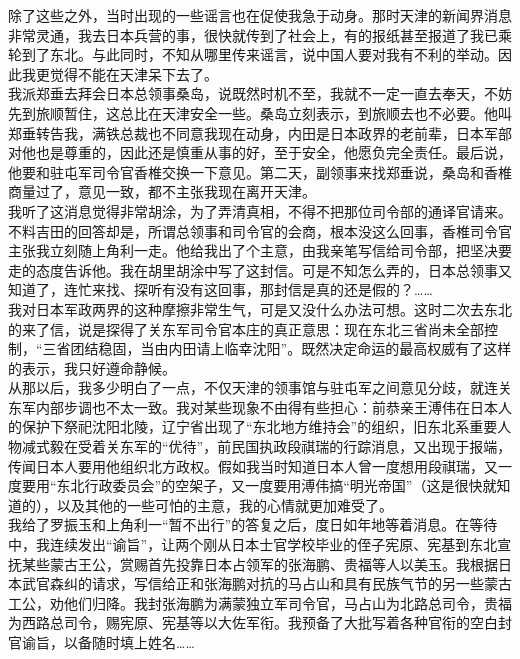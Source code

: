 除了这些之外，当时出现的一些谣言也在促使我急于动身。那时天津的新闻界消息非常灵通，我去日本兵营的事，很快就传到了社会上，有的报纸甚至报道了我已乘轮到了东北。与此同时，不知从哪里传来谣言，说中国人要对我有不利的举动。因此我更觉得不能在天津呆下去了。\\

我派郑垂去拜会日本总领事桑岛，说既然时机不至，我就不一定一直去奉天，不妨先到旅顺暂住，这总比在天津安全一些。桑岛立刻表示，到旅顺去也不必要。他叫郑垂转告我，满铁总裁也不同意我现在动身，内田是日本政界的老前辈，日本军部对他也是尊重的，因此还是慎重从事的好，至于安全，他愿负完全责任。最后说，他要和驻屯军司令官香椎交换一下意见。第二天，副领事来找郑垂说，桑岛和香椎商量过了，意见一致，都不主张我现在离开天津。\\

我听了这消息觉得非常胡涂，为了弄清真相，不得不把那位司令部的通译官请来。不料吉田的回答却是，所谓总领事和司令官的会商，根本没这么回事，香椎司令官主张我立刻随上角利一走。他给我出了个主意，由我亲笔写信给司令部，把坚决要走的态度告诉他。我在胡里胡涂中写了这封信。可是不知怎么弄的，日本总领事又知道了，连忙来找、探听有没有这回事，那封信是真的还是假的？……\\

我对日本军政两界的这种摩擦非常生气，可是又没什么办法可想。这时二次去东北的来了信，说是探得了关东军司令官本庄的真正意思：现在东北三省尚未全部控制，“三省团结稳固，当由内田请上临幸沈阳”。既然决定命运的最高权威有了这样的表示，我只好遵命静候。\\

从那以后，我多少明白了一点，不仅天津的领事馆与驻屯军之间意见分歧，就连关东军内部步调也不太一致。我对某些现象不由得有些担心：前恭亲王溥伟在日本人的保护下祭祀沈阳北陵，辽宁省出现了“东北地方维持会”的组织，旧东北系重要人物减式毅在受着关东军的“优待”，前民国执政段祺瑞的行踪消息，又出现于报端，传闻日本人要用他组织北方政权。假如我当时知道日本人曾一度想用段祺瑞，又一度要用“东北行政委员会”的空架子，又一度要用溥伟搞“明光帝国”（这是很快就知道的），以及其他的一些可怕的主意，我的心情就更加难受了。\\

我给了罗振玉和上角利一“暂不出行”的答复之后，度日如年地等着消息。在等待中，我连续发出“谕旨”，让两个刚从日本士官学校毕业的侄子宪原、宪基到东北宣抚某些蒙古王公，赏赐首先投靠日本占领军的张海鹏、贵福等人以美玉。我根据日本武官森纠的请求，写信给正和张海鹏对抗的马占山和具有民族气节的另一些蒙古工公，劝他们归降。我封张海鹏为满蒙独立军司令官，马占山为北路总司令，贵福为西路总司令，赐宪原、宪基等以大佐军衔。我预备了大批写着各种官衔的空白封官谕旨，以备随时填上姓名……\\

